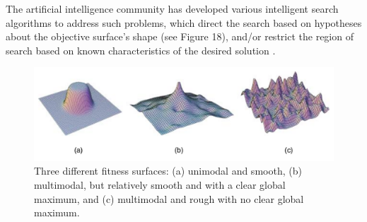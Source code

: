 \documentclass[12pt]{report} 	%
\numberwithin{figure}{chapter}
\numberwithin{table}{chapter}
\numberwithin{equation}{chapter}
\begin{document}
\begin{flushleft}
The artificial intelligence community has developed various intelligent search algorithms to address such problems, which direct the search based on hypotheses about the objective surface's shape (see Figure 18), and/or restrict the region of search based on known characteristics of the desired solution \cite[p. 64-108]{Russell:2009ai}.
\begin{figure}[h!]
\begin{center}
\includegraphics[scale=0.6]{DifferentTopologies}
\caption[Fitness surface topologies]{Three different fitness surfaces: (a) unimodal and smooth, (b) multimodal, but relatively smooth and with a clear global maximum, and (c) multimodal and rough with no clear global maximum.}
\end{center}
\vspace{6pt}
\end{figure}


\end{flushleft}
\end{document}
